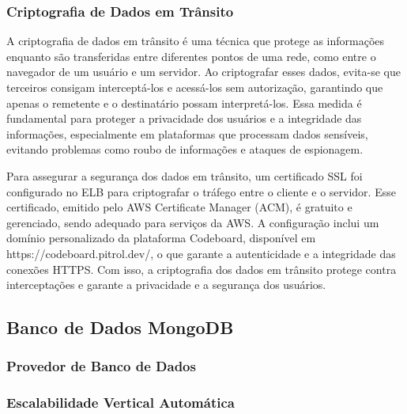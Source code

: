 \subsubsection{Criptografia de Dados em Trânsito}

A criptografia de dados em trânsito é uma técnica que protege as informações enquanto são transferidas entre diferentes pontos de uma rede, como entre o navegador de um usuário e um servidor. Ao criptografar esses dados, evita-se que terceiros consigam interceptá-los e acessá-los sem autorização, garantindo que apenas o remetente e o destinatário possam interpretá-los. Essa medida é fundamental para proteger a privacidade dos usuários e a integridade das informações, especialmente em plataformas que processam dados sensíveis, evitando problemas como roubo de informações e ataques de espionagem.

Para assegurar a segurança dos dados em trânsito, um certificado SSL foi configurado no ELB para criptografar o tráfego entre o cliente e o servidor. Esse certificado, emitido pelo AWS Certificate Manager (ACM), é gratuito e gerenciado, sendo adequado para serviços da AWS. A configuração inclui um domínio personalizado da plataforma Codeboard, disponível em https://codeboard.pitrol.dev/, o que garante a autenticidade e a integridade das conexões HTTPS. Com isso, a criptografia dos dados em trânsito protege contra interceptações e garante a privacidade e a segurança dos usuários.


\subsection{Banco de Dados MongoDB}

\subsubsection{Provedor de Banco de Dados}

\subsubsection{Escalabilidade Vertical Automática}

